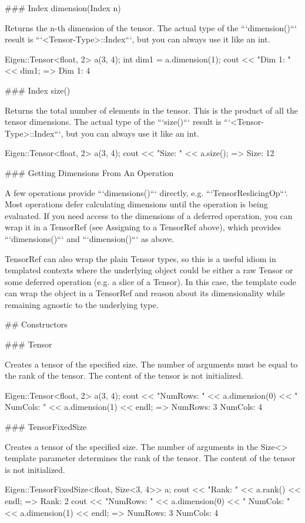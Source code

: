 \begin{DoxyCode}
### Index dimension(Index n)

Returns the n-th dimension of the tensor.  The actual type of the
```dimension()``` result is ```<Tensor-Type>::Index```, but you can
always use it like an int.

      Eigen::Tensor<float, 2> a(3, 4);
      int dim1 = a.dimension(1);
      cout << "Dim 1: " << dim1;
      => Dim 1: 4

### Index size()

Returns the total number of elements in the tensor.  This is the product of all
the tensor dimensions.  The actual type of the ```size()``` result is
```<Tensor-Type>::Index```, but you can always use it like an int.

    Eigen::Tensor<float, 2> a(3, 4);
    cout << "Size: " << a.size();
    => Size: 12


### Getting Dimensions From An Operation

A few operations provide ```dimensions()``` directly,
e.g. ```TensorReslicingOp```.  Most operations defer calculating dimensions
until the operation is being evaluated.  If you need access to the dimensions
of a deferred operation, you can wrap it in a TensorRef (see Assigning to a
TensorRef above), which provides ```dimensions()``` and ```dimension()``` as
above.

TensorRef can also wrap the plain Tensor types, so this is a useful idiom in
templated contexts where the underlying object could be either a raw Tensor
or some deferred operation (e.g. a slice of a Tensor).  In this case, the
template code can wrap the object in a TensorRef and reason about its
dimensionality while remaining agnostic to the underlying type.


## Constructors

### Tensor

Creates a tensor of the specified size. The number of arguments must be equal
to the rank of the tensor. The content of the tensor is not initialized.

    Eigen::Tensor<float, 2> a(3, 4);
    cout << "NumRows: " << a.dimension(0) << " NumCols: " << a.dimension(1) << endl;
    => NumRows: 3 NumCols: 4

### TensorFixedSize

Creates a tensor of the specified size. The number of arguments in the Size<>
template parameter determines the rank of the tensor. The content of the tensor
is not initialized.

    Eigen::TensorFixedSize<float, Size<3, 4>> a;
    cout << "Rank: " << a.rank() << endl;
    => Rank: 2
    cout << "NumRows: " << a.dimension(0) << " NumCols: " << a.dimension(1) << endl;
    => NumRows: 3 NumCols: 4


\end{DoxyCode}
